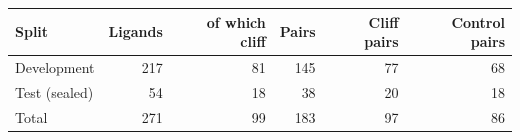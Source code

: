 \begin{tabular}{lrrrrr}
\toprule
Split & Ligands & of which cliff & Pairs & Cliff pairs & Control pairs \\
\midrule
Development & 217 & 81 & 145 & 77 & 68 \\
Test (sealed) & 54 & 18 & 38 & 20 & 18 \\
\midrule
Total & 271 & 99 & 183 & 97 & 86 \\
\bottomrule
\end{tabular}
